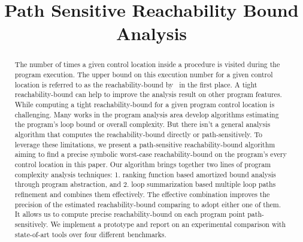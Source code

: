 \documentclass[runningheads]{llncs}
\begin{document}
%
\title{Path Sensitive Reachability Bound Analysis}
%
%
%

\maketitle              

%
\begin{abstract}
    The number of times a given control location 
    inside a procedure is visited during the program execution.
    The upper bound on this execution number for 
    a given control location is referred to as the reachability-bound by~\cite{GulwaniZ10} in the first place.
    A tight reachability-bound
    can help to improve the analysis result on other program features.
    While computing a tight reachability-bound for a given program control location is challenging.
    Many works in the program analysis area develop algorithms estimating the program's loop bound or overall complexity.
    But there isn't a general analysis algorithm that
    computes the reachability-bound
    directly or path-sensitively.
    To leverage these limitations,
    we present a path-sensitive reachability-bound algorithm
    aiming to find a precise symbolic worst-case reachability-bound on the program's every control location in this paper.
    Our algorithm brings together two lines of program complexity analysis techniques:
    1. ranking function based amortized bound analysis through program abstraction, and
    2. loop summarization based multiple loop paths refinement
    and combines them effectively. 
    The effective combination improves the precision of the estimated reachability-bound comparing to adopt either one of them.
    It allows us to compute precise reachability-bound on each program point path-sensitively.
    We implement a prototype and report on an experimental comparison with state-of-art tools over four different benchmarks.
\end{abstract}
%
%
%
\end{document}
